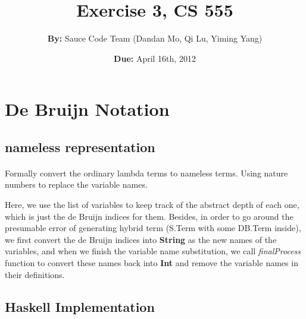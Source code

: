 \documentclass[10pt]{article}
\title{Exercise 3, CS 555}
\author{\textbf{By:} Sauce Code Team (Dandan Mo, Qi Lu, Yiming Yang)}
\date{\textbf{Due:} April 16th, 2012}
\begin{document}
        \maketitle
        \thispagestyle{empty}
        \newpage

\section{De Bruijn Notation}

\subsection{nameless representation}

\paragraph{}
Formally convert the ordinary lambda terms to nameless terms. Using nature numbers to replace the variable names. 

\parargraph{}
Here, we use the list of variables to keep track of the abstract depth of each one, which is just the de Bruijn indices for them. Besides, in order to go around the presumable error of generating hybrid term (S.Term with some DB.Term inside), we first convert the de Bruijn indices into \textbf{String} as the new names of the variables, and when we finish the variable name substitution, we call \textit{finalProcess} function to convert these names back into \textbf{Int} and remove the variable names in their definitions.

\subsection{Haskell Implementation}
\end{document}
